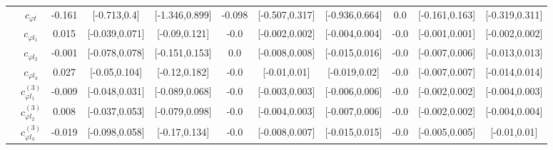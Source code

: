 \documentclass{article}
\begin{document}
\begin{table}[H]
\begin{tabular}{|c|c|c|c|c|c|c|c|c|c|c|}
 & $c_{\varphi t}$ & -0.161                             & [-0.713,0.4]                                 & [-1.346,0.899] & -0.098                             & [-0.507,0.317]                                 & [-0.936,0.664] & 0.0                             & [-0.161,0.163]                                 & [-0.319,0.311] \\ \cline{2-11}
 & $c_{\varphi l_1}$ & 0.015                             & [-0.039,0.071]                                 & [-0.09,0.121] & -0.0                             & [-0.002,0.002]                                 & [-0.004,0.004] & -0.0                             & [-0.001,0.001]                                 & [-0.002,0.002] \\ \cline{2-11}
 & $c_{\varphi l_2}$ & -0.001                             & [-0.078,0.078]                                 & [-0.151,0.153] & 0.0                             & [-0.008,0.008]                                 & [-0.015,0.016] & -0.0                             & [-0.007,0.006]                                 & [-0.013,0.013] \\ \cline{2-11}
 & $c_{\varphi l_3}$ & 0.027                             & [-0.05,0.104]                                 & [-0.12,0.182] & -0.0                             & [-0.01,0.01]                                 & [-0.019,0.02] & -0.0                             & [-0.007,0.007]                                 & [-0.014,0.014] \\ \cline{2-11}
 & $c_{\varphi l_1}^{(3)}$ & -0.009                             & [-0.048,0.031]                                 & [-0.089,0.068] & -0.0                             & [-0.003,0.003]                                 & [-0.006,0.006] & -0.0                             & [-0.002,0.002]                                 & [-0.004,0.003] \\ \cline{2-11}
 & $c_{\varphi l_2}^{(3)}$ & 0.008                             & [-0.037,0.053]                                 & [-0.079,0.098] & -0.0                             & [-0.004,0.003]                                 & [-0.007,0.006] & -0.0                             & [-0.002,0.002]                                 & [-0.004,0.004] \\ \cline{2-11}
 & $c_{\varphi l_3}^{(3)}$ & -0.019                             & [-0.098,0.058]                                 & [-0.17,0.134] & -0.0                             & [-0.008,0.007]                                 & [-0.015,0.015] & -0.0                             & [-0.005,0.005]                                 & [-0.01,0.01] \\ \cline{2-11}

\end{tabular}
\end{table}
\end{document}
